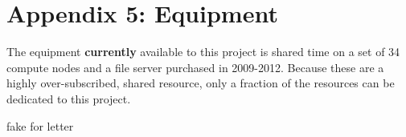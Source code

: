\documentclass[12pt]{article}
\begin{document}
\newpage
{}
\section*{Appendix 5: Equipment}

The equipment {\bf currently} available to this project is shared time on a set
of 34 compute nodes and a file server purchased in 2009-2012.  
Because these are a highly over-subscribed, shared resource, only a fraction of
the resources can be dedicated to this project.

\newpage
{}
fake for letter
\end{document}
